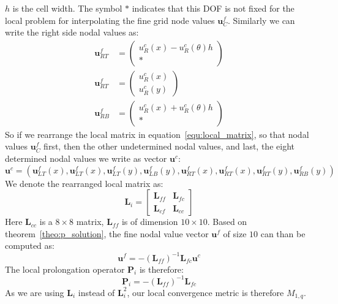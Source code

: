 $h$ is the cell width. The symbol $*$ indicates that this DOF is not fixed for the local problem for interpolating the fine grid node values $\mathbf{u}^f_{C}$. Similarly we can write the right side nodal values as:
\begin{align*}
 \mathbf{u}^f_{RT} &= \left(\begin{array}{c} u^c_R(x) - u^c_R(\theta)h \\ * \end{array}\right) \\
 \mathbf{u}^f_{RT} &= \left(\begin{array}{c} u^c_R(x) \\ u^c_R(y) \end{array}\right) \\
 \mathbf{u}^f_{RB} &= \left(\begin{array}{c} u^c_R(x) + u^c_R(\theta)h \\ * \end{array}\right) 
\end{align*}
So if we rearrange the local matrix in equation~\ref{equ:local_matrix}, so that nodal values $\mathbf{u}^f_{C}$ first, then the other undetermined nodal values, and last, the eight determined nodal values we write as vector $\mathbf{u}^c$: 
$$
\mathbf{u}^c = \left(\mathbf{u}^f_{LT}(x), \mathbf{u}^f_{LT}(x), \mathbf{u}^f_{LT}(y), \mathbf{u}^f_{LB}(y),\mathbf{u}^f_{RT}(x), \mathbf{u}^f_{RT}(x), \mathbf{u}^f_{RT}(y), \mathbf{u}^f_{RB}(y)\right)
$$
We denote the rearranged local matrix as: 
 \begin{equation}
 \label{equ:matrix_split}
\mathbf{L}_i = \begin{bmatrix} 
\mathbf{L}_{ff} & \mathbf{L}_{fc} \\
\mathbf{L}_{cf} & \mathbf{L}_{cc}
\end{bmatrix}
\end{equation}
 Here $\mathbf{L}_{cc}$ is a $8\times8$ matrix, $\mathbf{L}_{ff}$ is of dimension $10\times10$. Based on theorem~\ref{theo:p_solution}, the fine nodal value vector $\mathbf{u}^f$ of size $10$ can than be computed as:
 \begin{equation}
 \mathbf{u}^f = -(\mathbf{L}_{ff})^{-1}\mathbf{L}_{fc}\mathbf{u}^c
 \end{equation} 
The local prolongation operator $\mathbf{P}_i$ is therefore:
 \begin{equation}
 \mathbf{P}_i = -(\mathbf{L}_{ff})^{-1}\mathbf{L}_{fc}
 \label{equ:edge_P_2D}
 \end{equation}
As we are using $\mathbf{L}_i$ instead of $\mathbf{L}^2_i$, our local convergence metric is therefore $M_{1,q}$. 
